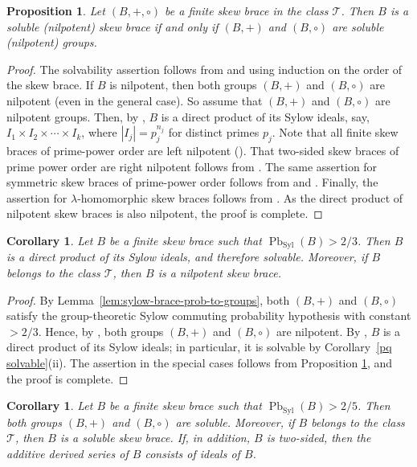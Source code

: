 \documentclass[11pt, oneside]{amsart}
\numberwithin{equation}{section}
\theoremstyle{plain}
\newtheorem{cor}[equation]{Corollary}
\newtheorem{pro}[equation]{Proposition}
\theoremstyle{definition}
\newcommand{\Pb}{\operatorname{Pb} }
\newcommand{\Syl}{\operatorname{Syl} }
\begin{document}
\begin{pro}\label{soluble group iff soluble skew brace}
    Let $(B, +, \circ)$ be a finite skew brace in the class $\mathcal{T}$. Then $B$ is a soluble (nilpotent)  skew brace if and only if  $(B,+)$ and $(B,\circ)$ are soluble (nilpotent)  groups.
\end{pro}
\begin{proof}
   The solvability assertion follows from \cite[Theorem 3.11, Theorem 3.13]{ST2023} and \cite[Theorem 4.20]{T2023} using induction on the order of the skew brace. If $B$ is nilpotent, then both groups $(B,+)$ and $(B,\circ)$ are nilpotent (even in the general case). So assume that $(B,+)$ and $(B,\circ)$ are nilpotent groups. Then, by \cite[Corollary 4.3.]{CSV19}, $B$ is a direct product of its Sylow ideals, say, $I_1\times I_2\times \cdots \times I_k $, where $|I_j| = p_j^{n_j}$ for distinct primes  $p_j$.
   Note that all finite skew braces of prime-power order are left nilpotent (\cite[Proposition 4.4.]{CSV19}). That two-sided skew braces of prime power order are right nilpotent follows from  \cite[Lemma 4.2]{MY26}. The same assertion for symmetric skew braces of prime-power order follows from \cite[Proposition 4.4]{CSV19} and \cite[Corollary 3.8]{T2023}. Finally, the assertion for $\lambda$-homomorphic skew braces follows from \cite[Theorem 3.13.]{ST2023}.  As the direct product of nilpotent skew braces is also nilpotent, the proof is complete.
\end{proof}


\begin{cor} %
Let $B$ be a finite skew brace such that $\Pb_{\Syl}(B)>2/3$.  Then
$B$ is a direct product of its Sylow ideals, and therefore  solvable. Moreover, if $B$ belongs to the class $\mathcal{T}$, then $B$ is a nilpotent skew brace. 
\end{cor}
\begin{proof}
By Lemma~\ref{lem:sylow-brace-prob-to-groups}, both $(B,+)$ and
$(B,\circ)$ satisfy the group-theoretic Sylow commuting probability
hypothesis with constant $>2/3$. Hence, by \cite{DLMS25}, both groups $(B,+)$ and $(B,\circ)$ are nilpotent. By \cite[Corollary~4.3]{CSV19}, $B$ is a direct product of its Sylow ideals; in particular, it is solvable by Corollary~\ref{pq solvable}(ii). The assertion in the special cases follows from 
Proposition \ref{soluble group iff soluble skew brace}, and the proof is complete.
\end{proof}
\begin{cor} %
Let $B$ be a finite skew brace such that $\Pb_{\Syl}(B)>2/5$.  Then
both groups $(B,+)$ and $(B,\circ)$ are soluble. 
Moreover, if $B$ belongs to the class $\mathcal T$, then $B$ is a soluble skew brace. If, in addition, $B$ is two-sided, then the additive derived series of $B$ consists of ideals of $B$.

\end{cor}
\end{document}
